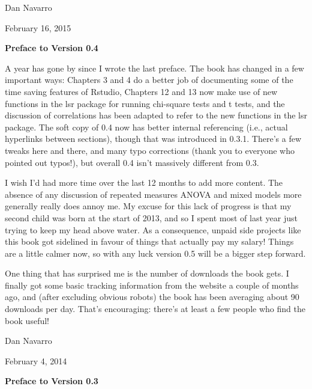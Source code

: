 \vspace*{24pt}
\noindent
Dan Navarro 

\noindent
February 16, 2015

\vspace*{30pt}

\begin{center}{\Large {\bf Preface to Version 0.4}}\end{center}
\vspace*{12pt}

\noindent
A year has gone by since I wrote the last preface. The book has changed in a few important ways: Chapters 3 and 4 do a better job of documenting some of the time saving features of Rstudio, Chapters 12 and 13 now make use of new functions in the lsr package for running chi-square tests and t tests, and the discussion of correlations has been adapted to refer to the new functions in the lsr package. The soft copy of 0.4 now has better internal referencing (i.e., actual hyperlinks between sections), though that was introduced in 0.3.1. There's a few tweaks here and there, and many typo corrections (thank you to everyone who pointed out typos!), but overall 0.4 isn't massively different from 0.3. 

I wish I'd had more time over the last 12 months to add more content. The absence of any discussion of repeated measures ANOVA and mixed models more generally really does annoy me. My excuse for this lack of progress is that my second child was born at the start of 2013, and so I spent most of last year just trying to keep my head above water. As a consequence, unpaid side projects like this book got sidelined in favour of things that actually pay my salary! Things are a little calmer now, so with any luck version 0.5 will be a bigger step forward.

One thing that has surprised me is the number of downloads the book gets. I finally got some basic tracking information from the website a couple of months ago, and (after excluding obvious robots) the book has been averaging about 90 downloads per day. That's encouraging: there's at least a few people who find the book useful!


\vspace*{24pt}
\noindent
Dan Navarro 

\noindent
February 4, 2014


\vspace*{30pt}



\begin{center}{\Large {\bf Preface to Version 0.3}}\end{center}
\vspace*{12pt}


